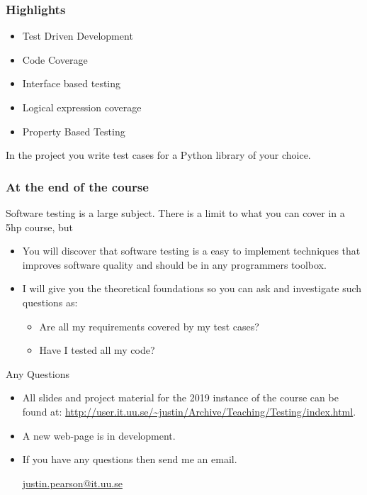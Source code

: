 \documentclass{beamer}
\begin{document}
\begin{frame}
  \frametitle{Highlights}
  \begin{itemize}
  \item Test Driven Development
  \item Code Coverage
  \item Interface based testing
  \item Logical expression coverage
  \item Property Based Testing
  \end{itemize}
  In the project you write test cases for a Python library of your
  choice.
\end{frame}
\begin{frame}
  \frametitle{At the end of the course}
  Software testing is a large subject. There is a limit to what you
  can cover in a 5hp course, but 
  \begin{itemize}
  \item You will discover that software testing is a easy to implement
    techniques that improves software quality and should be in any
    programmers toolbox.
  \item I will give you the theoretical foundations so you can ask
    and investigate such questions as:
    \begin{itemize}
    \item Are all my requirements covered by my test cases?
    \item Have I tested all my code?
    \end{itemize}
  \end{itemize}
\end{frame}
\begin{frame}{Any Questions}
  \begin{itemize}
  \item All slides and project material for the 2019 instance of the
    course can be found at: 
    \url{http://user.it.uu.se/~justin/Archive/Teaching/Testing/index.html}.     
 \item A new web-page is in development. 
  \item If you have any questions then send me an email.
    \begin{center}
      \url{justin.pearson@it.uu.se}
    \end{center}
  \end{itemize}
  
\end{frame}
\end{document}
